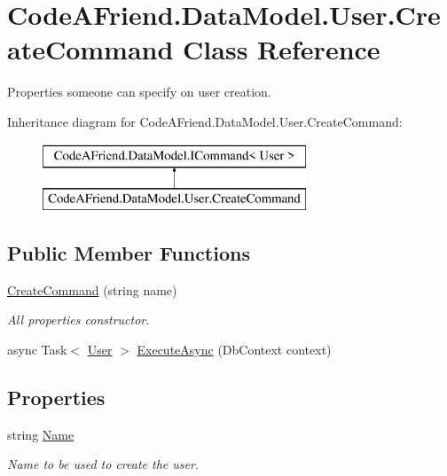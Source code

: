 \hypertarget{class_code_a_friend_1_1_data_model_1_1_user_1_1_create_command}{}\section{Code\+A\+Friend.\+Data\+Model.\+User.\+Create\+Command Class Reference}
\label{class_code_a_friend_1_1_data_model_1_1_user_1_1_create_command}


Properties someone can specify on user creation. 


Inheritance diagram for Code\+A\+Friend.\+Data\+Model.\+User.\+Create\+Command\+:\begin{figure}[H]
\begin{center}
\leavevmode
\includegraphics[height=2.000000cm]{class_code_a_friend_1_1_data_model_1_1_user_1_1_create_command}
\end{center}
\end{figure}
\subsection*{Public Member Functions}
\begin{DoxyCompactItemize}
\item 
\mbox{\hyperlink{class_code_a_friend_1_1_data_model_1_1_user_1_1_create_command_acf8bef896d5242b81824f379aa4144d1}{Create\+Command}} (string name)
\begin{DoxyCompactList}\small\item\em All properties constructor.\end{DoxyCompactList}\item 
async Task$<$ \mbox{\hyperlink{class_code_a_friend_1_1_data_model_1_1_user}{User}} $>$ \mbox{\hyperlink{class_code_a_friend_1_1_data_model_1_1_user_1_1_create_command_a83e6d841b7b008909b7b546d11cca7d6}{Execute\+Async}} (Db\+Context context)
\end{DoxyCompactItemize}
\subsection*{Properties}
\begin{DoxyCompactItemize}
\item 
string \mbox{\hyperlink{class_code_a_friend_1_1_data_model_1_1_user_1_1_create_command_a6f79ef49bd792a9d15ae1c74298bf11c}{Name}}
\begin{DoxyCompactList}\small\item\em Name to be used to create the user.\end{DoxyCompactList}\end{DoxyCompactItemize}


